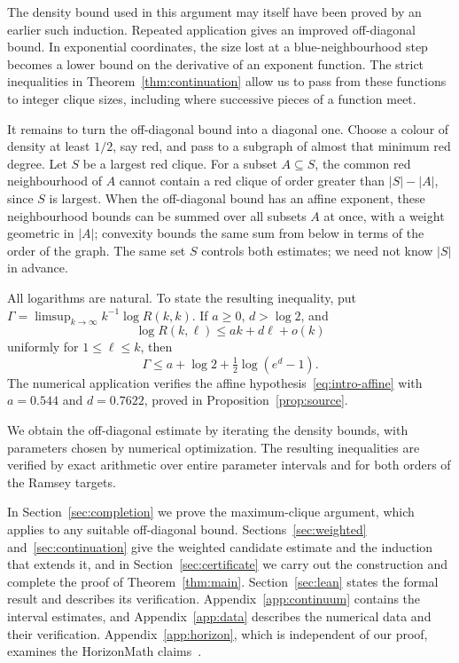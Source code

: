 \documentclass[11pt]{article}
\theoremstyle{definition}
\theoremstyle{remark}
\newcommand{\Gam}{\Gamma}
\numberwithin{equation}{section}
\begin{document}
The density bound used in this argument may itself have been
proved by an earlier such induction. Repeated application gives an
improved off-diagonal bound. In exponential coordinates, the size
lost at a blue-neighbourhood step becomes a lower bound on the
derivative of an exponent function. The strict inequalities in
Theorem~\ref{thm:continuation} allow us to pass from
these functions to integer clique sizes, including where successive
pieces of a function meet.

It remains to turn the off-diagonal bound into a diagonal one. Choose
a colour of density at least $1/2$, say red, and pass to a subgraph of
almost that minimum red degree. Let $S$ be a largest red clique. For
a subset $A\subseteq S$, the common red neighbourhood of $A$ cannot
contain a red clique of order greater than $|S|-|A|$, since $S$ is
largest. When the off-diagonal bound has an affine exponent, these
neighbourhood bounds can be summed over all subsets $A$ at once, with
a weight geometric in $|A|$; convexity bounds the same sum from below
in terms of the order of the graph. The same set $S$ controls both
estimates; we need not know $|S|$ in advance.

All logarithms are natural. To state the resulting inequality, put
$\Gam=\limsup_{k\to\infty}k^{-1}\log R(k,k)$. If $a\ge0$, $d>\log2$, and
\begin{equation}\label{eq:intro-affine}
 \log R(k,\ell)\le ak+d\ell+o(k)
\end{equation}
uniformly for $1\le\ell\le k$, then
\[
 \Gam\le a+\log2+\tfrac12\log(e^d-1).
\]
The numerical application verifies the affine
hypothesis~\eqref{eq:intro-affine} with $a=0.544$ and $d=0.7622$,
proved in Proposition~\ref{prop:source}.

We obtain the off-diagonal estimate by iterating the density bounds,
with parameters chosen by numerical optimization. The resulting
inequalities are verified by exact arithmetic over entire parameter
intervals and for both orders of the Ramsey targets.

In Section~\ref{sec:completion} we prove the maximum-clique argument,
which applies to any suitable off-diagonal bound.
Sections~\ref{sec:weighted} and~\ref{sec:continuation} give the weighted
candidate estimate and the induction that extends it, and in
Section~\ref{sec:certificate} we carry out the construction and complete
the proof of Theorem~\ref{thm:main}. Section~\ref{sec:lean} states the
formal result and describes its verification.
Appendix~\ref{app:continuum} contains the interval estimates, and
Appendix~\ref{app:data} describes the numerical data and their verification.
Appendix~\ref{app:horizon}, which is independent of our proof,
examines the HorizonMath claims~\cite{Horizon,HorizonCode}.
\end{document}

